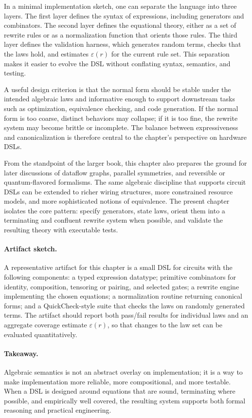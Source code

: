 In a minimal implementation sketch, one can separate the language into three layers. The first layer defines the syntax of expressions, including generators and combinators. The second layer defines the equational theory, either as a set of rewrite rules or as a normalization function that orients those rules. The third layer defines the validation harness, which generates random terms, checks that the laws hold, and estimates \(\varepsilon(r)\) for the current rule set. This separation makes it easier to evolve the DSL without conflating syntax, semantics, and testing.

A useful design criterion is that the normal form should be stable under the intended algebraic laws and informative enough to support downstream tasks such as optimization, equivalence checking, and code generation. If the normal form is too coarse, distinct behaviors may collapse; if it is too fine, the rewrite system may become brittle or incomplete. The balance between expressiveness and canonicalization is therefore central to the chapter's perspective on hardware DSLs.

From the standpoint of the larger book, this chapter also prepares the ground for later discussions of dataflow graphs, parallel symmetries, and reversible or quantum-flavored formalisms. The same algebraic discipline that supports circuit DSLs can be extended to richer wiring structures, more constrained resource models, and more sophisticated notions of equivalence. The present chapter isolates the core pattern: specify generators, state laws, orient them into a terminating and confluent rewrite system when possible, and validate the resulting theory with executable tests.

\paragraph{Artifact sketch.} A representative artifact for this chapter is a small DSL for circuits with the following components: a typed expression datatype; primitive combinators for identity, composition, tensoring or pairing, and selected gates; a rewrite engine implementing the chosen equations; a normalization routine returning canonical forms; and a QuickCheck-style suite that checks the laws on randomly generated terms. The artifact should report both pass/fail results for individual laws and an aggregate coverage estimate \(\varepsilon(r)\), so that changes to the law set can be evaluated quantitatively.

\paragraph{Takeaway.} Algebraic semantics is not an abstract overlay on implementation; it is a way to make implementation more reliable, more compositional, and more testable. When a DSL is designed around equations that are sound, terminating where possible, and empirically well covered, the resulting system supports both formal reasoning and practical engineering.
